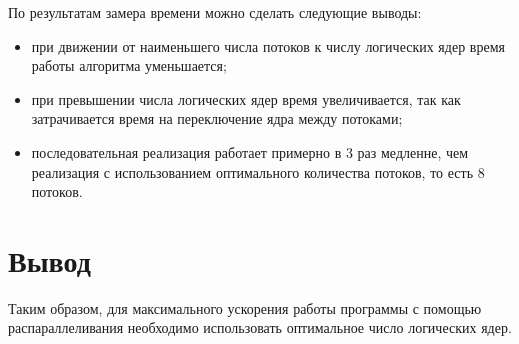 По результатам замера времени можно сделать следующие выводы:
\begin{itemize}
	\item при движении от наименьшего числа потоков к числу логических ядер
	время работы алгоритма уменьшается;
    \item при превышении числа логических ядер время увеличивается, так как 
    затрачивается время на переключение ядра между потоками;
    \item последовательная реализация работает примерно в 3 раз медленне,
    чем реализация с использованием оптимального количества
    потоков, то есть 8 потоков.
\end{itemize}


\section{Вывод}

Таким образом, для максимального ускорения работы программы
с помощью распараллеливания необходимо использовать оптимальное число 
логических ядер. 
